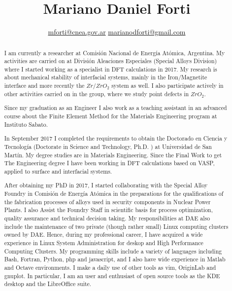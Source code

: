\documentclass{my_cv}
\begin{document}
\title{Mariano Daniel Forti}
\date{ \centering \url{mforti@cnea.gov.ar} \hspace{3cm} \url{marianodforti@gmail.com } }
\begin{titlepage}
\maketitle

\begin{abstract}
  \linespread{1.5}\selectfont
  \thispagestyle{empty}
    I am currently a researcher at Comisión Nacional de Energía Atómica, Argentina. My activities are carried on at División Aleaciones Especiales (Special Alloys Division) where I started working as a specialist in DFT calculations in 2017. My research is about mechanical stability of interfacial systems, mainly in the Iron/Magnetite interface and more recently the $Zr / ZrO_{2}$ system as well. I also participate actively in other activities carried on in the group, where we study point defects in $ZrO_2$.

Since my graduation as an Engineer I also work as a teaching assistant in an advanced course about the Finite Element Method for the Materials Engineering program at Instituto Sabato.

In September 2017 I completed the requirements to obtain the Doctorado en Ciencia y Tecnología (Doctorate in Science and Technology, Ph.D. ) at Universidad de San Martín. My degree studies are in Materials Engineering. Since the Final Work to get The Engineering degree I have been working in DFT calculations based on VASP, applied to surface and interfacial systems.

After obtaining my PhD in 2017, I started collaborating with the Special Alloy Foundry in Comisión de Energía Atómica in the preparations for the qualifications of the fabrication processes of alloys used in security components in Nuclear Power Plants. I also Assist the Foundry Staff in scientific basis for process optimization, quality assurance and technical decision taking. My responsibilities at DAE also include the maintenance of two private (though rather small) Linux computing clusters owned by DAE. Hence, during my professional career, I have acquired a wide experience in Linux System Administration for deskop and High Performance Computing Clusters. My programming skills include a variety of languages including Bash, Fortran, Python, php and javascript, and I also have wide experience in Matlab and Octave environments. I make a daily use of other tools as vim, OriginLab and gnuplot. In particular, I am an user and enthusiast of open source tools as the KDE desktop and the LibreOffice suite. 


\end{abstract}
\vfill
\end{titlepage}
\end{document}
